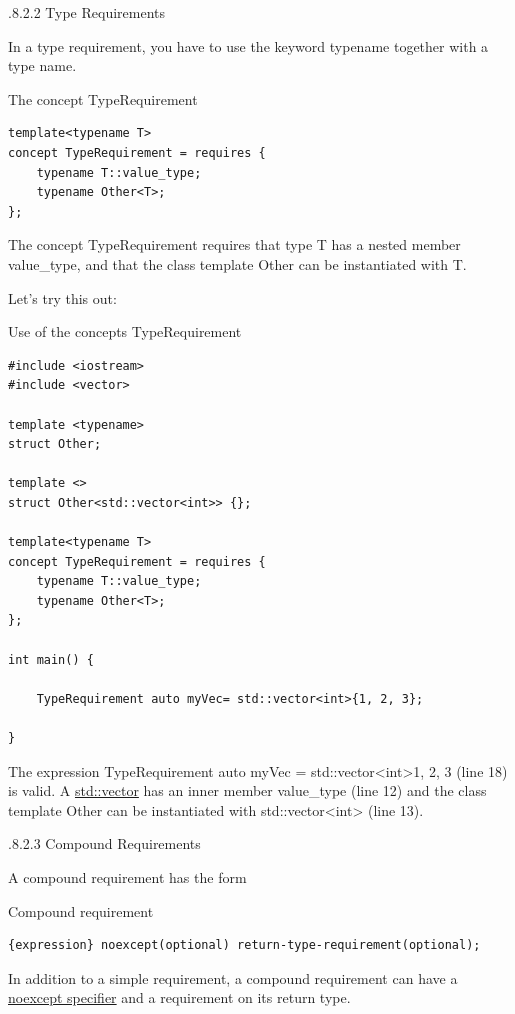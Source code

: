 .8.2.2\hspace{0.2cm} Type Requirements

In a type requirement, you have to use the keyword typename together with a type name.

\noindent
The concept TypeRequirement
\begin{lstlisting}[style=styleCXX]
template<typename T>
concept TypeRequirement = requires {
	typename T::value_type;
	typename Other<T>;
};
\end{lstlisting}

The concept TypeRequirement requires that type T has a nested member value\_type, and that the class template Other can be instantiated with T.

Let’s try this out:

\noindent
Use of the concepts TypeRequirement
\begin{lstlisting}[style=styleCXX]
#include <iostream>
#include <vector>

template <typename>
struct Other;

template <>
struct Other<std::vector<int>> {};

template<typename T>
concept TypeRequirement = requires {
	typename T::value_type;
	typename Other<T>;
};

int main() {

	TypeRequirement auto myVec= std::vector<int>{1, 2, 3};

}
\end{lstlisting}

The expression TypeRequirement auto myVec = std::vector<int>{1, 2, 3} (line 18) is valid. A \href{https://en.cppreference.com/w/cpp/container/vector}{std::vector} has an inner member value\_type (line 12) and the class template Other can be instantiated with std::vector<int> (line 13).

.8.2.3\hspace{0.2cm} Compound Requirements

A compound requirement has the form

\noindent
Compound requirement
\begin{lstlisting}[style=styleCXX]
{expression} noexcept(optional) return-type-requirement(optional);
\end{lstlisting}

In addition to a simple requirement, a compound requirement can have a \href{https://en.cppreference.com/w/cpp/language/noexcept_spec}{noexcept specifier} and a requirement on its return type.


